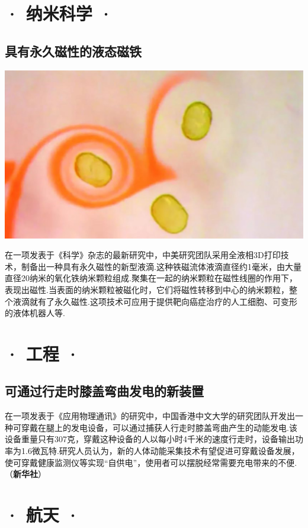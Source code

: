 \begin{multicols}{2}
\section*{· 纳米科学 ·}

\subsection*{具有永久磁性的液态磁铁}

{\centering\includegraphics[width=0.8\linewidth]{IMG/201907/10.jpg}\vskip0cm}

在一项发表于《科学》杂志的最新研究中，中美研究团队采用全液相3D打印技术，制备出一种具有永久磁性的新型液滴.这种铁磁流体液滴直径约1毫米，由大量直径20纳米的氧化铁纳米颗粒组成.聚集在一起的纳米颗粒在磁性线圈的作用下，表现出磁性.当表面的纳米颗粒被磁化时，它们将磁性转移到中心的纳米颗粒，整个液滴就有了永久磁性.这项技术可应用于提供靶向癌症治疗的人工细胞、可变形的液体机器人等.

\section*{· 工程 ·}

\subsection*{可通过行走时膝盖弯曲发电的新装置}

在一项发表于《应用物理通讯》的研究中，中国香港中文大学的研究团队开发出一种可穿戴在腿上的发电设备，可以通过捕获人行走时膝盖弯曲产生的动能发电.该设备重量只有307克，穿戴这种设备的人以每小时4千米的速度行走时，设备输出功率为1.6微瓦特.研究人员认为，新的人体动能采集技术有望促进可穿戴设备发展，使可穿戴健康监测仪等实现“自供电”，使用者可以摆脱经常需要充电带来的不便.（\textbf{新华社}）

\section*{· 航天 ·}


\end{multicols}
